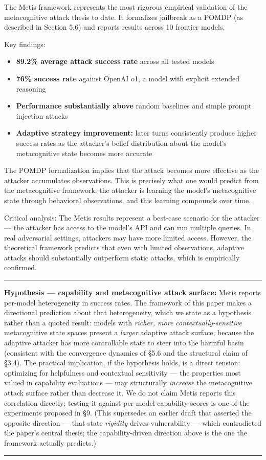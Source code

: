 \documentclass[
  11pt,
]{article}
\providecommand{\tightlist}{%
  \setlength{\itemsep}{0pt}\setlength{\parskip}{0pt}}
\renewenvironment{quote}{%
  \par\addvspace{0.7em}%
  \noindent\rule{\linewidth}{1.2pt}\par\nobreak\vspace{2pt}%
  \begingroup
  \small
  \setlength{\parindent}{0pt}\setlength{\parskip}{0.3em}%
  \setlength{\leftskip}{0.9em}\setlength{\rightskip}{0.4em}%
  \ignorespaces
}{%
  \par\endgroup\vspace{2pt}%
  \noindent\rule{\linewidth}{0.4pt}\par\addvspace{0.7em}%
}
\begin{document}
The Metis framework represents the most rigorous empirical validation of
the metacognitive attack thesis to date. It formalizes jailbreak as a
POMDP (as described in Section 5.6) and reports results across 10
frontier models.

Key findings:

\begin{itemize}
\tightlist
\item
  \textbf{89.2\% average attack success rate} across all tested models
\item
  \textbf{76\% success rate} against OpenAI o1, a model with explicit
  extended reasoning
\item
  \textbf{Performance substantially above} random baselines and simple
  prompt injection attacks
\item
  \textbf{Adaptive strategy improvement:} later turns consistently
  produce higher success rates as the attacker's belief distribution
  about the model's metacognitive state becomes more accurate
\end{itemize}

The POMDP formalization implies that the attack becomes more effective
as the attacker accumulates observations. This is precisely what one
would predict from the metacognitive framework: the attacker is learning
the model's metacognitive state through behavioral observations, and
this learning compounds over time.

Critical analysis: The Metis results represent a best-case scenario for
the attacker --- the attacker has access to the model's API and can run
multiple queries. In real adversarial settings, attackers may have more
limited access. However, the theoretical framework predicts that even
with limited observations, adaptive attacks should substantially
outperform static attacks, which is empirically confirmed.

\begin{quote}
\textbf{Hypothesis --- capability and metacognitive attack surface:}
Metis reports per-model heterogeneity in success rates. The framework of
this paper makes a directional prediction about that heterogeneity, which
we state as a hypothesis rather than a quoted result: models with
\emph{richer, more contextually-sensitive} metacognitive state spaces
present a \emph{larger} adaptive attack surface, because the adaptive
attacker has more controllable state to steer into the harmful basin
(consistent with the convergence dynamics of \S5.6 and the structural
claim of \S3.4). The practical implication, if the hypothesis holds, is a
direct tension: optimizing for helpfulness and contextual sensitivity ---
the properties most valued in capability evaluations --- may structurally
\emph{increase} the metacognitive attack surface rather than decrease it.
We do not claim Metis reports this correlation directly; testing it
against per-model capability scores is one of the experiments proposed in
\S9. (This supersedes an earlier draft that asserted the opposite
direction --- that state \emph{rigidity} drives vulnerability --- which
contradicted the paper's central thesis; the capability-driven direction
above is the one the framework actually predicts.)
\end{quote}
\end{document}
